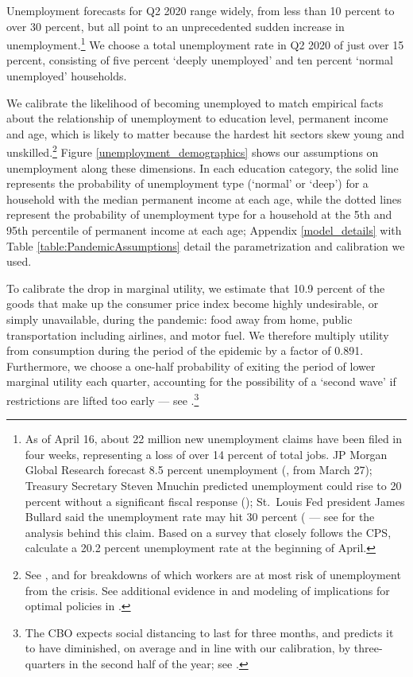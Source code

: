 \documentclass[titlepage,a4paper]{\econtex}
\begin{document}
Unemployment forecasts for Q2 2020 range widely, from less than 10 percent to over 30 percent, but all point to an unprecedented sudden increase in unemployment.\footnote{As of April 16, about 22 million new unemployment claims have been filed in four weeks, representing a loss of over 14 percent  of total jobs.  JP Morgan Global Research forecast 8.5 percent unemployment (\cite{JPMorganBlog2020}, from March 27); Treasury Secretary Steven Mnuchin predicted unemployment could rise to 20 percent without a significant fiscal response (\cite{Bloomberg1}); St.\ Louis Fed president James Bullard said the unemployment rate may hit 30 percent  (\cite{Bloomberg2} --- see \cite{FariaBlog2020} for the analysis behind this claim.  Based on a survey that closely follows the CPS, \cite{BickBlandin2020} calculate a 20.2 percent unemployment rate at the beginning of April.}
We choose a total unemployment rate in Q2 2020 of just over 15 percent, consisting of five percent `deeply unemployed' and ten percent `normal unemployed' households.

We calibrate the likelihood of becoming unemployed to match empirical facts about the relationship of unemployment to education level, permanent income and age, which is likely to matter because the hardest hit sectors skew young and unskilled.\footnote{See \cite{GasconCOVID2020}, \cite{LeiboviciSocial2020} and \cite{covid_USsurvey} for breakdowns of which workers are at most risk of unemployment from the crisis.
  See additional evidence in \cite{kmv_pandemics} and modeling of implications for optimal policies in \cite{healthWealth}.}
Figure \ref{unemployment_demographics} shows our assumptions on unemployment along these dimensions.
In each education category, the solid line represents the probability of unemployment type (`normal' or `deep') for a household with the median permanent income at each age, while the dotted lines represent the probability of unemployment type for a household at the 5th and 95th percentile of permanent income at each age; Appendix \ref{model_details} with Table \ref{table:PandemicAssumptions} detail the parametrization and calibration we used.

To calibrate the drop in marginal utility, we estimate that 10.9 percent of the goods that make up the consumer price index become highly undesirable, or simply unavailable, during the pandemic: food away from home, public transportation including airlines, and motor fuel.
We therefore multiply utility from consumption during the period of the epidemic by a factor of 0.891.
Furthermore, we choose a one-half probability of exiting the period of lower marginal utility each quarter, accounting for the possibility of a `second wave' if restrictions are lifted too early --- see \cite{cyranoski_we_2020}.\footnote{The CBO expects social distancing to last for three months, and predicts it to have diminished, on average and in line with our calibration, by three-quarters in the second half of the year; see \cite{SwagelCBO2020}.}
\end{document}

